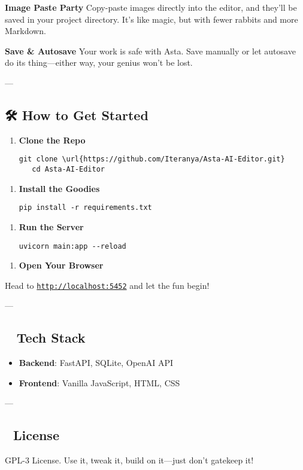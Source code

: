 \documentclass[12pt, a4paper, onecolumn, oneside]{report}
\begin{document}
\textbf{Image Paste Party}
Copy-paste images directly into the editor, and they’ll be saved in your project directory. It’s like magic, but with fewer rabbits and more Markdown.

\textbf{Save & Autosave}
Your work is safe with Asta. Save manually or let autosave do its thing—either way, your genius won’t be lost.

---

\subsection{🛠️ How to Get Started}

\begin{enumerate}
\item \textbf{Clone the Repo}
   \begin{verbatim}
git clone \url{https://github.com/Iteranya/Asta-AI-Editor.git}
   cd Asta-AI-Editor
\end{verbatim}
\end{enumerate}

\begin{enumerate}
\item \textbf{Install the Goodies}
   \begin{verbatim}
pip install -r requirements.txt
\end{verbatim}
\end{enumerate}

\begin{enumerate}
\item \textbf{Run the Server}
   \begin{verbatim}
uvicorn main:app --reload
\end{verbatim}
\end{enumerate}

\begin{enumerate}
\item \textbf{Open Your Browser}
\end{enumerate}
   Head to \texttt{\url{http://localhost:5452}} and let the fun begin!

---

\subsection{🧙‍♂️ Tech Stack}

\begin{itemize}
\item \textbf{Backend}: FastAPI, SQLite, OpenAI API
\item \textbf{Frontend}: Vanilla JavaScript, HTML, CSS
\end{itemize}

---

\subsection{📄 License}

GPL-3 License. Use it, tweak it, build on it—just don’t gatekeep it!
\end{document}
